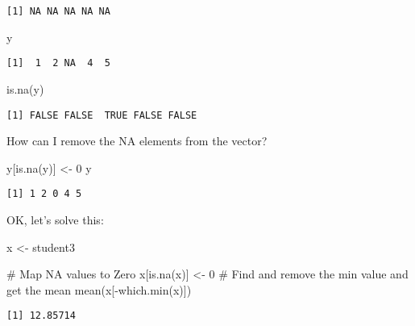 \documentclass[
  letterpaper,
  DIV=11,
  numbers=noendperiod]{scrartcl}
\newenvironment{Shaded}{\begin{snugshade}}{\end{snugshade}}
\newcommand{\CommentTok}[1]{\textcolor[rgb]{0.37,0.37,0.37}{#1}}
\newcommand{\DecValTok}[1]{\textcolor[rgb]{0.68,0.00,0.00}{#1}}
\newcommand{\FunctionTok}[1]{\textcolor[rgb]{0.28,0.35,0.67}{#1}}
\newcommand{\NormalTok}[1]{\textcolor[rgb]{0.00,0.23,0.31}{#1}}
\newcommand{\OtherTok}[1]{\textcolor[rgb]{0.00,0.23,0.31}{#1}}
\newcommand{\SpecialCharTok}[1]{\textcolor[rgb]{0.37,0.37,0.37}{#1}}
\begin{document}
\begin{verbatim}
[1] NA NA NA NA NA
\end{verbatim}

\begin{Shaded}
\begin{Highlighting}[]
\NormalTok{y}
\end{Highlighting}
\end{Shaded}

\begin{verbatim}
[1]  1  2 NA  4  5
\end{verbatim}

\begin{Shaded}
\begin{Highlighting}[]
\FunctionTok{is.na}\NormalTok{(y)}
\end{Highlighting}
\end{Shaded}

\begin{verbatim}
[1] FALSE FALSE  TRUE FALSE FALSE
\end{verbatim}

How can I remove the NA elements from the vector?

\begin{Shaded}
\begin{Highlighting}[]
\NormalTok{y[}\FunctionTok{is.na}\NormalTok{(y)] }\OtherTok{\textless{}{-}} \DecValTok{0}
\NormalTok{y}
\end{Highlighting}
\end{Shaded}

\begin{verbatim}
[1] 1 2 0 4 5
\end{verbatim}

OK, let's solve this:

\begin{Shaded}
\begin{Highlighting}[]
\NormalTok{x }\OtherTok{\textless{}{-}}\NormalTok{ student3}

\CommentTok{\# Map NA values to Zero}
\NormalTok{x[}\FunctionTok{is.na}\NormalTok{(x)] }\OtherTok{\textless{}{-}} \DecValTok{0}
\CommentTok{\# Find and remove the min value and get the mean}
\FunctionTok{mean}\NormalTok{(x[}\SpecialCharTok{{-}}\FunctionTok{which.min}\NormalTok{(x)])}
\end{Highlighting}
\end{Shaded}

\begin{verbatim}
[1] 12.85714
\end{verbatim}
\end{document}
